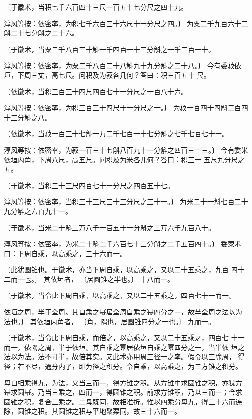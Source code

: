 \documentclass[a4paper,12pt,UTF8,twoside]{ctexbook}
\begin{document}
〔于徽术，当积七千六百四十三尺一百五十七分尺之四十九。

淳风等按：依密率，为积七千六百三十六尺十一分尺之四。〕 为粟二千九百六十二斛二十七分斛之二十六。

〔于徽术，当粟二千八百三十斛一千四百一十三分斛之一千二百一十。

淳风等按：依密率，为粟二千八百二十八斛九十九分斛之二十八。〕 今有委菽依垣，下周三丈，高七尺。问积及为菽各几何？答曰：积三百五十 尺。

〔依徽术，当积三百三十四尺四百七十一分尺之一百八十六。

淳风等按：依密率，为积三百三十四尺十一分尺之一。〕 为菽一百四十四斛二百四十三分斛之八。

〔依徽术，当菽一百三十七斛一万二千七百一十七分斛之七千七百七十一。

淳风等按：依密率，为菽一百三十七斛八百九十一分斛之四百三十三。〕 今有委米依垣内角，下周八尺，高五尺。问积及为米各几何？答曰：积三十 五尺九分尺之五。

〔于徽术，当积三十三尺四百七十一分尺之四百五十七。

淳风等按：依密率，当积三十三尺三十三分尺之三十一。〕 为米二十一斛七百二十九分斛之六百九十一。

〔于徽术，当米二十斛三万八千一百五十一分斛之三万六千九百八十。

淳风等按：依密率，为米二十斛二千六百七十三分斛之二千五百四十。〕 委粟术曰：下周自乘，以高乘之，三十六而一。

〔此犹圆锥也。于徽术，亦当下周自乘，以高乘之，又以二十五乘之，九百 四十二而一也。〕 其依垣者， 〔居圆锥之半也。〕 十八而一。

〔于徽术，当令此下周自乘，以高乘之，又以二十五乘之，四百七十一而一。

依垣之周，半于全周。其自乘之幂居全周自乘之幂四分之一，故半全周之法以为 法也。〕 其依垣内角者， 〔角，隅也，居圆锥四分之一也。〕 九而一。

〔于徽术，当令此下周自乘，而倍之，以高乘之，又以二十五乘之，四百七 十一而一。依隅之周，半于依垣。其自乘之幂居依垣自乘之幂四分之一，当半依 垣之法以为法。法不可半，故倍其实。又此术亦用周三径一之率。假令以三除周， 得径；若不尽，通分内子，即为径之积分。令自乘，以高乘之，为三方锥之积分。

母自相乘得九，为法，又当三而一，得方锥之积。从方锥中求圆锥之积，亦犹方 幂求圆幂。乃当三乘之，四而一，得圆锥之积。前求方锥积，乃以三而一；今求 圆锥之积，复合三乘之。二母既同，故相准折。惟以四乘分母九，得三十六而连 除，圆锥之积。其圆锥之积与平地聚粟同，故三十六而一。
\end{document}
